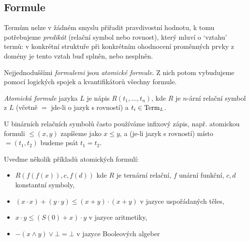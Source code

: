 \subsection{Formule}

Termům nelze v žádném smyslu přiřadit pravdivostní hodnotu, k tomu potřebujeme \emph{predikát} (relační symbol nebo rovnost), který mluví o `vztahu' termů: v konkrétní struktuře při konkrétním ohodnocení proměnných prvky z domény je tento vztah buď splněn, nebo nesplněn. 

Nejjednoduššími \emph{formulemi} jsou \emph{atomické formule}. Z nich potom vybudujeme pomocí logických spojek a kvantifikátorů všechny formule.


\begin{definition}
    \emph{Atomická formule} jazyka $L$ je nápis $R(t_1,\dots,t_n)$, kde $R$ je $n$-ární relační symbol z $L$ (včetně $=$ jde-li o jazyk s rovností) a $t_i\in\operatorname{Term}_L$. %
\end{definition}

U binárních relačních symbolů často používáme infixový zápis, např. atomickou formuli $\leq(x,y)$ zapíšeme jako $x\leq y$, a (je-li jazyk s rovností) místo $=(t_1,t_2)$ budeme psát $t_1=t_2$.

\begin{example}
    Uveďme několik příkladů atomických formulí:
    \begin{itemize}
        \item $R(f(f(x)),c, f(d))$ kde $R$ je ternární relační, $f$ unární funkční, $c,d$ konstantní symboly,
        \item $(x\cdot x)+(y\cdot y)\leq (x+y)\cdot(x+y)$ v jazyce uspořádaných těles,
        \item $x\cdot y\leq (S(0)+x)\cdot y$ v jazyce aritmetiky,
        \item $-(x\land y)\lor\bot=\bot$ v jazyce Booleových algeber        
    \end{itemize}
\end{example}


